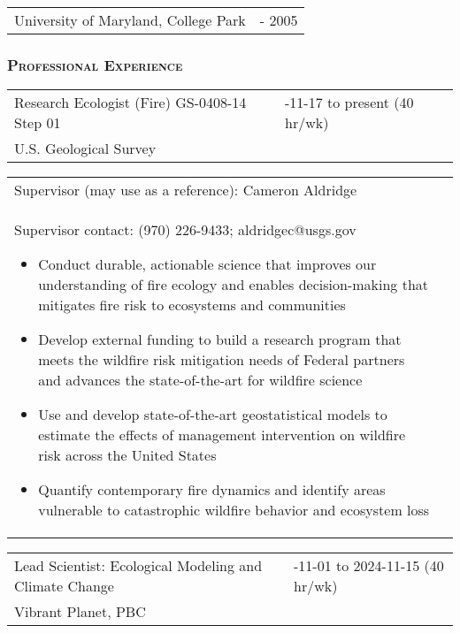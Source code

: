 \documentclass[10pt,english]{article}
\providecommand{\tabularnewline}{\\}
\begin{document}
\begin{tabularx}{\textwidth}{@{}>{\raggedright}p{5.25in} >{\raggedleft}X@{}}
University of Maryland, College Park & 2003 - 2005 \tabularnewline
\end{tabularx}


\subsubsection*{\textsc{Professional Experience}}
\vspace{-0.5ex}

\linespread{1.1}

\renewcommand{\arraystretch}{1.2}
\begin{tabularx}{\textwidth}{@{}>{\raggedright}p{3.75in} >{\raggedleft}X@{}}
Research Ecologist (Fire) GS-0408-14 Step 01 & 2024-11-17 to present (40 hr/wk) \tabularnewline
U.S. Geological Survey & \tabularnewline
\end{tabularx}

\renewcommand{\arraystretch}{1.2}
\begin{tabularx}{\textwidth}{@{}>{\raggedright}p{6.25in} >{\raggedleft}X@{}}
\addtolength{\leftskip}{5ex}Supervisor (may use as a reference): Cameron Aldridge \tabularnewline
\addtolength{\leftskip}{5ex}Supervisor contact: (970) 226-9433; aldridgec@usgs.gov
\begin{itemize}
\itemsep0em
\item{Conduct durable, actionable science that improves our understanding of fire ecology and enables decision-making that mitigates fire risk to ecosystems and communities}
\item{Develop external funding to build a research program that meets the wildfire risk mitigation needs of Federal partners and advances the state-of-the-art for wildfire science}
\item{Use and develop state-of-the-art geostatistical models to estimate the effects of management intervention on wildfire risk across the United States}
\item{Quantify contemporary fire dynamics and identify areas vulnerable to catastrophic wildfire behavior and ecosystem loss}
\end{itemize}
\end{tabularx}

\renewcommand{\arraystretch}{1.2}
\begin{tabularx}{\textwidth}{@{}>{\raggedright}p{3.75in} >{\raggedleft}X@{}}
Lead Scientist: Ecological Modeling and Climate Change & 2023-11-01 to 2024-11-15 (40 hr/wk) \tabularnewline
Vibrant Planet, PBC & \tabularnewline
\end{tabularx}
\end{document}
